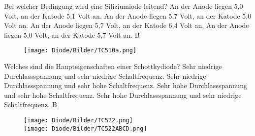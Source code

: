 \vspace*{0.65cm}

{Bei welcher Bedingung wird eine Siliziumiode leitend?}%
{An der Anode liegen 5,0 Volt, an der Katode 5,1 Volt an.}%
{An der Anode liegen 5,7 Volt, an der Katode 5,0 Volt an.}%
{An der Anode liegen 5,7 Volt, an der Katode 6,4 Volt an.}%
{An der Anode liegen 5,0 Volt, an der Katode 5,7 Volt an.}%
{B}%


\begin{figure}[H]
	\centering
	\texttt{[image: Diode/Bilder/TC510a.png]}
	\end{figure}

{Welches sind die Haupteigenschaften einer Schottkydiode?}%
{Sehr niedrige Durchlassspannung und sehr niedrige Schaltfrequenz.}%
{Sehr niedrige Durchlassspannung und sehr hohe Schaltfrequenz.}%
{Sehr hohe Durchlassspannung und sehr hohe Schaltfrequenz.}%
{Sehr hohe Durchlassspannung und sehr niedrige Schaltfrequenz.}%
{B}%



\begin{figure}[H]
	\centering
	\texttt{[image: Diode/Bilder/TC522.png]}\\
	\texttt{[image: Diode/Bilder/TC522ABCD.png]}
	\end{figure}

